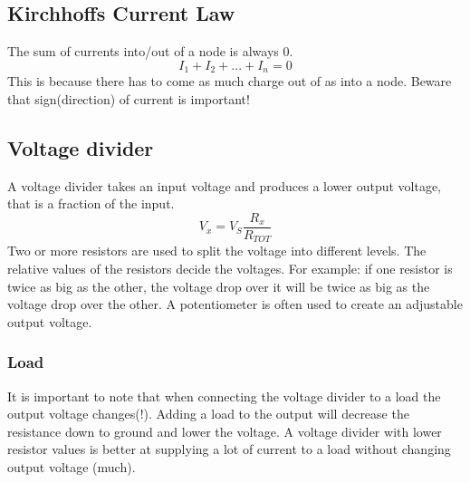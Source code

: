 \subsection{Kirchhoffs Current Law}
The sum of currents into/out of a node is always 0.
\begin{equation}
    I_1 + I_2 + ... + I_n = 0
\end{equation}
This is because there has to come as much charge out of as into a node. Beware that sign(direction) of current is important!
\subsection{Voltage divider}
A voltage divider takes an input voltage and produces a lower output voltage, 
that is a fraction of the input.
\begin{equation}
    V_x = V_S \frac{R_x}{R_{TOT}}
\end{equation}
Two or more resistors are used to split the voltage into different levels. The 
relative values of the resistors decide the voltages. For example: if one 
resistor is twice as big as the other, the voltage drop over it will be twice 
as big as the voltage drop over the other. A potentiometer is often used to 
create an adjustable output voltage.
\subsubsection{Load}
It is important to note that when connecting the voltage divider to a load the 
output voltage changes(!). Adding a load to the output will decrease the 
resistance down to ground and lower the voltage. A voltage divider with lower 
resistor values is better at supplying a lot of current to a load without 
changing output voltage (much).

